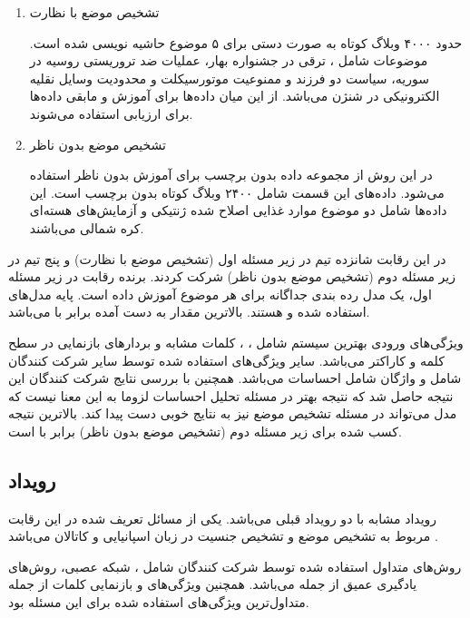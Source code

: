  \begin{enumerate}
 	\item تشخیص موضع با نظارت
 	
 	حدود ۴۰۰۰ وبلاگ کوتاه به صورت دستی
 	 برای ۵ موضوع حاشیە نویسی شده است. موضوعات
 	شامل
 	 ،
 	  ترقی در جشنواره بهار، عملیات ضد تروریستی روسیه در سوریه، سیاست دو فرزند و ممنوعیت موتورسیکلت و محدودیت وسایل نقلیه الکترونیکی در شنژن می‌باشد. از این میان
 	 دادە‌ها برای آموزش و مابقی دادە‌ها برای ارزیابی استفاده می‌شوند.
 	
 	\item 
 	تشخیص موضع بدون ناظر
	
	در این روش از مجموعه داده بدون برچسب برای آموزش بدون ناظر استفاده می‌شود. دادە‌های این قسمت شامل ۲۴۰۰ وبلاگ کوتاه بدون برچسب است. این دادە‌ها شامل دو موضوع موارد غذایی اصلاح شده ژنتیکی و آزمایش‌های هستە‌ای کره شمالی می‌باشند.
 \end{enumerate}

در این رقابت شانزده تیم در زیر مسئله اول (تشخیص موضع با نظارت) و پنج تیم در زیر مسئله دوم (تشخیص موضع بدون ناظر) شرکت کردند. برنده رقابت در زیر مسئله اول، یک مدل ردە بندی جداگانه برای
هر موضوع آموزش داده است. پایه مدل‌های استفاده شده 
 و 
  هستند. بالاترین مقدار
 به دست آمده برابر با
 می‌باشد.
 
 ویژگی‌های ورودی بهترین سیستم شامل
 ،
 	،
  کلمات مشابه و بردارهای بازنمایی در سطح کلمه و کاراکتر می‌‌باشد. سایر ویژگی‌های استفاده شده توسط سایر شرکت کنندگان شامل 
   و واژگان شامل احساسات 
   می‌باشد. همچنین با بررسی نتایج شرکت کنندگان این نتیجه حاصل شد که نتیجه بهتر در مسئله تحلیل احساسات لزوما به این معنا نیست که مدل می‌تواند در مسئله تشخیص موضع نیز به نتایج خوبی دست پیدا کند. بالاترین نتیجه کسب شده برای زیر مسئله دوم (تشخیص موضع بدون ناظر) برابر با
    است.
\subsection{رویداد
	}

رویداد
مشابه با دو رویداد قبلی می‌باشد. یکی از مسائل تعریف شده در این رقابت مربوط به تشخیص موضع و تشخیص جنسیت در زبان اسپانیایی و کاتالان می‌باشد \cite{taule2017overview}.

روش‌های متداول استفاده شده توسط شرکت کنندگان شامل
، شبکه عصبی، روش‌های یادگیری
عمیق از جمله 
 می‌باشد. همچنین ویژگی‌های
  و بازنمایی کلمات
   از جمله متداول‌ترین ویژگی‌های استفاده شده برای این مسئله بود.
   
